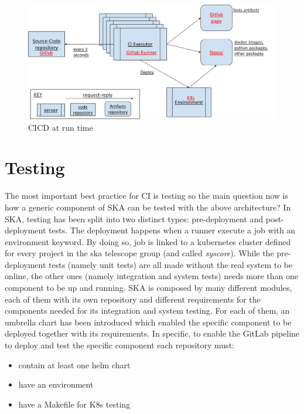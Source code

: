\documentclass[a4paper]{spie}  %
\begin{document}
\begin{figure}[!htb]
   \centering
   \includegraphics*[width=0.8\columnwidth]{CICD runtime}
   \caption{CICD at run time}
   \label{fig:cicdruntime}
\end{figure}

\section{Testing}
The most important best practice for CI is testing so the main question now is how a generic component of SKA can be tested with the above architecture?
In SKA, testing has been split into two distinct types: pre-deployment and post-deployment tests. The deployment happens when a runner execute a job with an environment keyword. By doing so, job is linked to a kubernetes cluster defined for every project in the ska telescope group (and called \textit{syscore}).
While the pre-deployment tests (namely unit tests) are all made without the real system to be online, the other ones (namely integration and system tests) needs more than one component to be up and running.
SKA is composed by many different modules, each of them with its own repository and different requirements for the components needed for its integration and system testing. For each of them, an umbrella chart has been introduced which enabled the specific component to be deployed together with its requirements.
In specific, to enable the GitLab pipeline to deploy and test the specific component each repository must:
\begin{itemize}
    \item contain at least one helm chart
    \item have an environment
    \item have a Makefile for K8s testing
\end{itemize}
\end{document}
